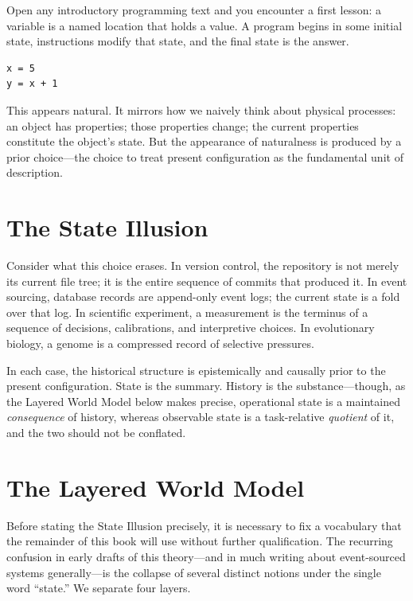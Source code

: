 \documentclass[12pt, a4paper, openany]{book}
\theoremstyle{plain}
\theoremstyle{definition}
\theoremstyle{remark}
\begin{document}
Open any introductory programming text and you encounter a first lesson: a variable
is a named location that holds a value. A program begins in some initial state,
instructions modify that state, and the final state is the answer.

\begin{lstlisting}[style=rust, caption={The standard state-centric view}]
x = 5
y = x + 1
\end{lstlisting}

This appears natural. It mirrors how we naively think about physical processes: an
object has properties; those properties change; the current properties constitute
the object's state. But the appearance of naturalness is produced by a prior
choice---the choice to treat present configuration as the fundamental unit of
description.

\section{The State Illusion}

Consider what this choice erases. In version control, the repository is not merely
its current file tree; it is the entire sequence of commits that produced it. In
event sourcing, database records are append-only event logs; the current state is
a fold over that log. In scientific experiment, a measurement is the terminus of
a sequence of decisions, calibrations, and interpretive choices. In evolutionary
biology, a genome is a compressed record of selective pressures.

In each case, the historical structure is epistemically and causally prior to the
present configuration. State is the summary. History is the substance---though,
as the Layered World Model below makes precise, operational state is a
maintained \emph{consequence} of history, whereas observable state is a
task-relative \emph{quotient} of it, and the two should not be conflated.

\section{The Layered World Model}
\label{sec:layered-world-model}

Before stating the State Illusion precisely, it is necessary to fix a vocabulary
that the remainder of this book will use without further qualification. The
recurring confusion in early drafts of this theory---and in much writing about
event-sourced systems generally---is the collapse of several distinct notions
under the single word ``state.'' We separate four layers.
\end{document}
